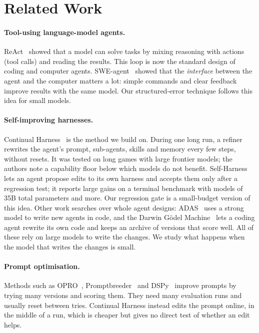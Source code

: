 \section{Related Work}
\label{sec:related}

\paragraph{Tool-using language-model agents.}
ReAct~\cite{yao2023react} showed that a model can solve tasks by mixing reasoning with actions
(tool calls) and reading the results. This loop is now the standard design of coding and computer
agents. SWE-agent~\cite{yang2024sweagent} showed that the \emph{interface} between the agent and
the computer matters a lot: simple commands and clear feedback improve results with the same model.
Our structured-error technique follows this idea for small models.

\paragraph{Self-improving harnesses.}
Continual Harness~\cite{karten2026continual} is the method we build on. During one long run, a
refiner rewrites the agent's prompt, sub-agents, skills and memory every few steps, without resets.
It was tested on long games with large frontier models; the authors note a capability floor below
which models do not benefit. Self-Harness~\cite{zhang2026selfharness} lets an agent propose edits
to its own harness and accepts them only after a regression test; it reports large gains on a
terminal benchmark with models of 35B total parameters and more. Our regression gate is a small-budget
version of this idea. Other work searches over whole agent designs: ADAS~\cite{hu2025adas} uses a
strong model to write new agents in code, and the Darwin G\"odel Machine~\cite{zhang2025dgm} lets
a coding agent rewrite its own code and keeps an archive of versions that score well. All of these
rely on large models to write the changes. We study what happens when the model that writes the
changes is small.

\paragraph{Prompt optimisation.}
Methods such as OPRO~\cite{yang2024opro}, Promptbreeder~\cite{fernando2023promptbreeder} and
DSPy~\cite{khattab2024dspy} improve prompts by trying many versions and scoring them. They need
many evaluation runs and usually reset between tries. Continual Harness instead edits the prompt
online, in the middle of a run, which is cheaper but gives no direct test of whether an edit helps.

